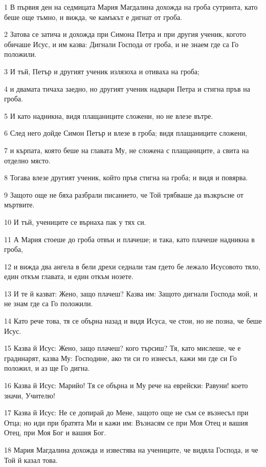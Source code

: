 \par 1 В първия ден на седмицата Мария Магдалина дохожда на гроба сутринта, като беше още тъмно, и вижда, че камъкът е дигнат от гроба.
\par 2 Затова се затича и дохожда при Симона Петра и при другия ученик, когото обичаше Исус, и им казва: Дигнали Господа от гроба, и не знаем где са Го положили.
\par 3 И тъй, Петър и другият ученик излязоха и отиваха на гроба;
\par 4 и двамата тичаха заедно, но другият ученик надвари Петра и стигна пръв на гроба.
\par 5 И като надникна, видя плащаниците сложени, но не влезе вътре.
\par 6 След него дойде Симон Петър и влезе в гроба; видя плащаниците сложени,
\par 7 и кърпата, която беше на главата Му, не сложена с плащаниците, а свита на отделно място.
\par 8 Тогава влезе другият ученик, който пръв стигна на гроба; и видя и повярва.
\par 9 Защото още не бяха разбрали писанието, че Той трябваше да възкръсне от мъртвите.
\par 10 И тъй, учениците се върнаха пак у тях си.
\par 11 А Мария стоеше до гроба отвън и плачеше; и така, като плачеше надникна в гроба,
\par 12 и вижда два ангела в бели дрехи седнали там гдето бе лежало Исусовото тяло, един откъм главата, и един откъм нозете.
\par 13 И те й казват: Жено, защо плачеш? Казва им: Защото дигнали Господа мой, и не знам где са Го положили.
\par 14 Като рече това, тя се обърна назад и видя Исуса, че стои, но не позна, че беше Исус.
\par 15 Казва й Исус: Жено, защо плачеш? кого търсиш? Тя, като мислеше, че е градинарят, казва Му: Господине, ако ти си го изнесъл, кажи ми где си Го положил, и аз ще Го дигна.
\par 16 Казва й Исус: Марийо! Тя се обърна и Му рече на еврейски: Равуни! което значи, Учителю!
\par 17 Казва й Исус: Не се допирай до Мене, защото още не съм се възнесъл при Отца; но иди при братята Ми и кажи им: Възнасям се при Моя Отец и вашия Отец, при Моя Бог и вашия Бог.
\par 18 Мария Магдалина дохожда и известява на учениците, че видяла Господа, и че Той й казал това.

